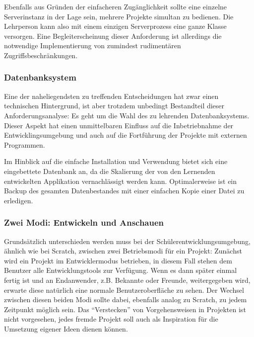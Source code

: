Ebenfalls aus Gründen der einfacheren Zugänglichkeit sollte eine einzelne Serverinstanz in der Lage sein, mehrere Projekte simultan zu bedienen. Die Lehrperson kann also mit einem einzigen Serverprozess eine ganze Klasse versorgen. Eine Begleiterscheinung dieser Anforderung ist allerdings die notwendige Implementierung von zumindest rudimentären Zugriffsbeschränkungen.

\subsubsection{Datenbanksystem}

Eine der naheliegendsten zu treffenden Entscheidungen hat zwar einen technischen Hintergrund, ist aber trotzdem unbedingt Bestandteil dieser Anforderungsanalyse: Es geht um die Wahl des zu lehrenden Datenbanksystems. Dieser Aspekt hat einen unmittelbaren Einfluss auf die Inbetriebnahme der Entwicklingsumgebung und auch auf die Fortführung der Projekte mit externen Programmen.

Im Hinblick auf die einfache Installation und Verwendung bietet sich eine eingebettete Datenbank an, da die Skalierung der von den Lernenden entwickelten Applikation vernachlässigt werden kann. Optimalerweise ist ein Backup des gesamten Datenbestandes mit einer einfachen Kopie einer Datei zu erledigen.


\subsubsection{Zwei Modi: Entwickeln und Anschauen}

Grundsätzlich unterschieden werden muss bei der Schülerentwicklungsumgebung, ähnlich wie bei Scratch, zwischen zwei Betriebsmodi für ein Projekt: Zunächst wird ein Projekt im Entwicklermodus betrieben, in diesem Fall stehen dem Benutzer alle Entwicklungstools zur Verfügung. Wenn es dann später einmal fertig ist und an Endanwender, z.B. Bekannte oder Freunde, weitergegeben wird, erwarte diese natürlich eine normale Benutzeroberfläche zu sehen. Der Wechsel zwischen diesen beiden Modi sollte dabei, ebenfalls analog zu Scratch, zu jedem Zeitpunkt möglich sein. Das ``Verstecken'' von Vorgehensweisen in Projekten ist nicht vorgesehen, jedes fremde Projekt soll auch als Inspiration für die Umsetzung eigener Ideen dienen können.

